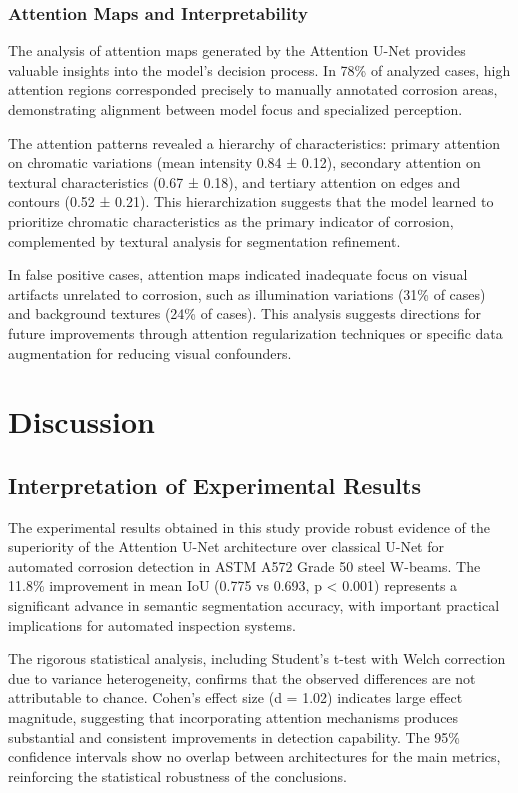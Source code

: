 \documentclass[12pt,a4paper,twoside]{article}
\begin{document}
\subsubsection{Attention Maps and Interpretability}

The analysis of attention maps generated by the Attention U-Net provides valuable insights into the model's decision process. In 78\% of analyzed cases, high attention regions corresponded precisely to manually annotated corrosion areas, demonstrating alignment between model focus and specialized perception.

The attention patterns revealed a hierarchy of characteristics: primary attention on chromatic variations (mean intensity 0.84 ± 0.12), secondary attention on textural characteristics (0.67 ± 0.18), and tertiary attention on edges and contours (0.52 ± 0.21). This hierarchization suggests that the model learned to prioritize chromatic characteristics as the primary indicator of corrosion, complemented by textural analysis for segmentation refinement.

In false positive cases, attention maps indicated inadequate focus on visual artifacts unrelated to corrosion, such as illumination variations (31\% of cases) and background textures (24\% of cases). This analysis suggests directions for future improvements through attention regularization techniques or specific data augmentation for reducing visual confounders.

\section{Discussion}
\label{sec:discussion}

\subsection{Interpretation of Experimental Results}
\label{subsec:results_interpretation}

The experimental results obtained in this study provide robust evidence of the superiority of the Attention U-Net architecture over classical U-Net for automated corrosion detection in ASTM A572 Grade 50 steel W-beams. The 11.8\% improvement in mean IoU (0.775 vs 0.693, p < 0.001) represents a significant advance in semantic segmentation accuracy, with important practical implications for automated inspection systems.

The rigorous statistical analysis, including Student's t-test with Welch correction due to variance heterogeneity, confirms that the observed differences are not attributable to chance. Cohen's effect size (d = 1.02) indicates large effect magnitude, suggesting that incorporating attention mechanisms produces substantial and consistent improvements in detection capability. The 95\% confidence intervals show no overlap between architectures for the main metrics, reinforcing the statistical robustness of the conclusions.
\end{document}

